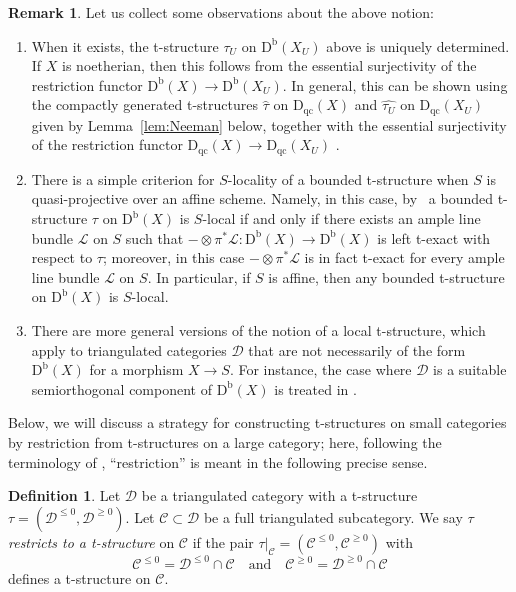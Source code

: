 \documentclass[11pt, reqno]{amsart}
\numberwithin{equation}{section}
\theoremstyle{plain}
\theoremstyle{remark}
\theoremstyle{definition}
\newtheorem{definition}[theorem]{Definition}
\newtheorem{remark}[theorem]{Remark}
\theoremstyle{italicsname}
\newcommand{\Db}{\mathrm{D^b}}
\newcommand{\Dqc}{\mathrm{D}_{\mathrm{qc}}}
\newcommand{\cL}{\mathcal{L}}
\newcommand{\cC}{\mathscr{C}}
\newcommand{\cD}{\mathscr{D}}
\begin{document}
\begin{remark}
\label{remark-local-t-structures}
Let us collect some observations about the above notion: 
\begin{enumerate}
\item When it exists, the t-structure $\tau_U$ on $\Db(X_U)$ above is uniquely determined. 
If $X$ is noetherian, then this follows from the essential surjectivity of the restriction functor $\Db(X) \to \Db(X_U)$. 
In general, this can be shown using the compactly generated t-structures $\widehat{\tau}$ on $\Dqc(X)$ and $\widehat{\tau_U}$ on $\Dqc(X_U)$ given by Lemma~\ref{lem:Neeman} below, together with the essential surjectivity of the restriction functor $\Dqc(X) \to \Dqc(X_U)$ \cite[\href{https://stacks.math.columbia.edu/tag/08ED}{Tag 08ED}]{stacks-project}. 

\item  \label{remark-local-over-affine}  There is a simple criterion for $S$-locality of a bounded t-structure when $S$ is quasi-projective over an affine scheme. 
Namely, in this case, by~\cite[Theorem 2.3.2]{P-t-structures} a bounded t-structure $\tau$ on $\Db(X)$ is $S$-local if and only if there exists an ample line bundle $\cL$ on $S$ such that $- \otimes \pi^*\cL \colon \Db(X) \to \Db(X)$ is left t-exact with respect to $\tau$; moreover, in this case $-\otimes\pi^* \cL$ is in fact t-exact for every ample line bundle $\cL$ on $S$. 
In particular, if $S$ is affine, then any bounded t-structure on $\Db(X)$ is $S$-local. 

\item    There are more general versions of the notion of a local t-structure, which apply to triangulated categories $\cD$ that are not necessarily of the form $\Db(X)$ for a morphism $X \to S$. For instance, the case where $\cD$ is a suitable semiorthogonal component of $\Db(X)$ is treated in \cite[Section~4.2]{stability-families}. 
\end{enumerate} 
\end{remark}

Below, we will discuss a strategy for constructing t-structures on small categories by restriction from t-structures on a large category; here, following the terminology of \cite[Section 3]{KLP}, ``restriction'' is meant in the following precise sense. 

\begin{definition}
Let $\cD$ be a triangulated category with a t-structure $\tau = (\cD^{\leqslant 0}, \cD^{\geqslant 0})$. 
Let $\cC \subset \cD$ be a full triangulated subcategory. 
We say $\tau$ \emph{restricts to a t-structure} on $\cC$ if the pair $\tau \vert_{\cC} = (\cC^{\leqslant 0}, \cC^{\geqslant 0})$ with 
\begin{equation*}
    \cC^{\leqslant 0} = \cD^{\leqslant 0}\cap \cC \quad \text{and} \quad 
    \cC^{\geqslant 0} = \cD^{\geqslant0} \cap \cC
\end{equation*}
defines a t-structure on $\cC$. 
\end{definition}
\end{document}
